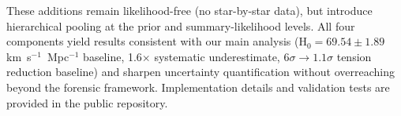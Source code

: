 \documentclass[preprint, linenumbers]{aastex701}
\begin{document}
These additions remain likelihood-free (no star-by-star data), but introduce hierarchical pooling at the prior and summary-likelihood levels. All four components yield results consistent with our main analysis (H$_0 = 69.54 \pm 1.89$ km~s$^{-1}$~Mpc$^{-1}$ baseline, 1.6$\times$ systematic underestimate, 6$\sigma \to 1.1\sigma$ tension reduction baseline) and sharpen uncertainty quantification without overreaching beyond the forensic framework. Implementation details and validation tests are provided in the public repository.
\end{document}

